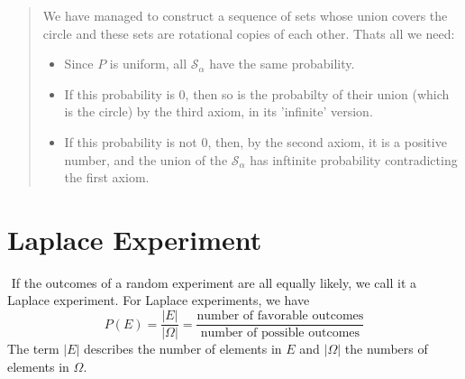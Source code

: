 \documentclass[twoside,11pt,a4paper]{article}
\newif\ifEN \ENtrue	                %
\def\tr|#1|#2|{\ifEN #2\else #1\fi}     %
\def\trr;#1;#2;{\ifEN #2\else #1\fi}     %
\newenvironment{ttile}[1]{\begin{tcolorbox}[colback=tile,sharp corners,title=#1]}{\end{tcolorbox}}
\theoremstyle{definition}
\begin{document}
\begin{remark}
\begin{enumerate}
\begin{quote}
          \tr|Wir haben es geschafft, eine Folge von Mengen zu konstruieren, deren Vereinigung den Kreis überdeckt und diese Mengen sind 
              alles rotierte Varianten voneinander. Das ist alles was wir brauchen:
             |We have managed to construct a sequence of sets whose union covers the circle and these sets are rotational copies of each other. Thats all we need:|
      \begin{itemize}
      \item \tr|Da $P$ gleichmässig ist, haben alle $\mathcal{S}_\alpha$ die gleiche Wahrscheinlichkeit. 
               |Since $P$ is uniform, all $\mathcal{S}_\alpha$ have the same probability.|
      \item \tr|Wenn diese Wahrscheinlichkeit 0 ist, dann ist es auch die Wahrscheinlichkeit ihrer Vereinigung (dem Kreis) 
                nach dem dritten Axiom (in der unendlichen Version). 
               |If this probability is 0, then so is the probabilty of their union
                (which is the circle) by the third axiom, in its 'infinite' version.|
      \item \tr|Wenn diese Wahrscheinlichkeit nicht 0 ist, dass ist es nach dem zweiten Axiom eine positive Zahl und die Vereinigung der $\mathcal{S}_\alpha$ 
                hat unendliche Wahrscheinlichkeit, im Widerspruch zum ersten Axiom.
               |If this probability is not 0, then, by the second axiom,
                it is a positive number, and the union of the $\mathcal{S}_\alpha$ has inftinite
                probability contradicting the first axiom. |
      \end{itemize}
    \end{quote}
    \fi
  \end{enumerate}
\end{remark}

\newpage
\section{\tr|Laplace-Experimente|Laplace Experiment|}
  
\begin{ttile}{\tr|Laplace-Experiment|Laplace experiment|}
$ $
\tr|Wenn die möglichen Ausgänge eines Zufallsexperiments alle gleich wahrscheinlich sind, so wird es ein Laplace-Experiment genannt. Für ein 
    Laplace-Experiment gilt:
   |If the outcomes of a random experiment are all equally likely, we call it a Laplace experiment. For Laplace experiments, we have|
\[
P(E)=\frac{|E|}{|\Omega|}=\frac{\text{\tr|Anzahl günstiger Ergebnisse|number of favorable outcomes|}}{\text{\tr|Anzahl möglicher Ergebnisse|number of possible outcomes|}}
\]
\trr;Der Term $|E|$ steht für die Anzahl Elemente in $E$ und$|\Omega|$ für die Anzahl Elemente in $\Omega$.   
   ;The term $|E|$ describes the number of elements in $E$ and $|\Omega|$ the numbers of elements in $\Omega$.;
\end{ttile}
  
\end{document}
